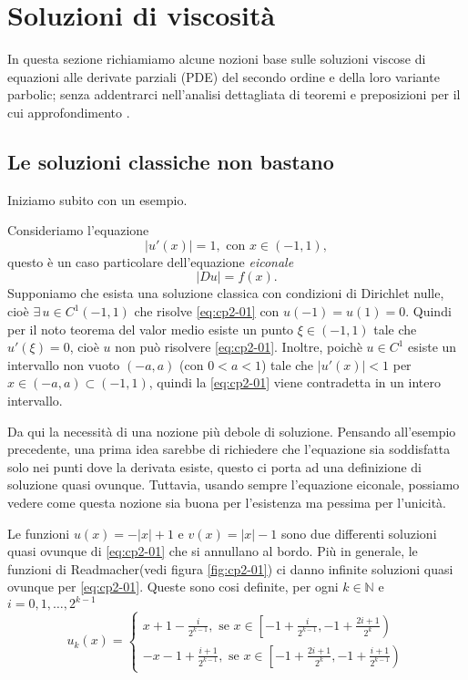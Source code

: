 \chapter{Soluzioni di viscosità}
In questa sezione richiamiamo alcune nozioni base sulle soluzioni viscose di equazioni alle derivate parziali (PDE) del secondo ordine e della loro variante parbolic; senza addentrarci nell'analisi dettagliata di teoremi e preposizioni per il cui approfondimento \cite[vedi][]{fed:drag,giga:main,crand:lion,yun:giga}.
%
%
%
\section{Le soluzioni classiche non bastano}
Iniziamo subito con un esempio.
\begin{esempio}
Consideriamo l'equazione
\begin{equation}
\label{eq:cp2-01}
|u'(x)| = 1,\text{ con $x\in(-1,1)$},
\end{equation}
questo è un caso particolare dell'equazione \emph{eiconale}
\[
|Du| = f(x).
\]
Supponiamo che esista una soluzione classica con condizioni di Dirichlet nulle, cioè $\exists\, u\in C^1(-1,1)$ che risolve \eqref{eq:cp2-01} con $u(-1)=u(1)=0$. Quindi per il noto teorema del valor medio esiste un punto $\xi\in (-1,1)$ tale che $u'(\xi)=0$, cioè $u$ non può risolvere \eqref{eq:cp2-01}. Inoltre, poichè $u\in C^1$ esiste un intervallo non vuoto $(-a,a)$ (con $0<a<1$) tale che $|u'(x)|<1$ per $x\in(-a,a)\subset(-1,1)$, quindi la \eqref{eq:cp2-01} viene contradetta in un intero intervallo.
\end{esempio}
Da qui la necessità di una nozione più debole di soluzione. Pensando all'esempio precedente, una prima idea sarebbe di richiedere che l'equazione sia soddisfatta solo nei punti dove la derivata esiste, questo ci porta ad una definizione di soluzione quasi ovunque. Tuttavia, usando sempre l'equazione eiconale, possiamo vedere come questa nozione sia buona per l'esistenza ma pessima per l'unicità.
\begin{esempio}
Le funzioni $u(x)=-|x|+1$ e $v(x)=|x|-1$ sono due differenti soluzioni quasi ovunque di \eqref{eq:cp2-01} che si annullano al bordo. Più in generale, le funzioni di Readmacher(vedi figura \ref{fig:cp2-01}) ci danno infinite soluzioni quasi ovunque per \eqref{eq:cp2-01}.
Queste sono cosi definite, per ogni $k\in \mathbb{N}$ e $i=0,1,\dots,2^{k-1}$
\[
u_k(x)=
\begin{cases}
  x+1-\frac{i}{2^{k-1}},\text{ se }x\in\left[-1+\frac{i}{2^{k-1}},-1+\frac{2i+1}{2^k}\right) \\
  -x-1 +\frac{i+1}{2^{k-1}},\text{ se }x\in\left[-1+\frac{2i+1}{2^k},-1+\frac{i+1}{2^{k-1}}\right)
\end{cases}
\]
\end{esempio}
